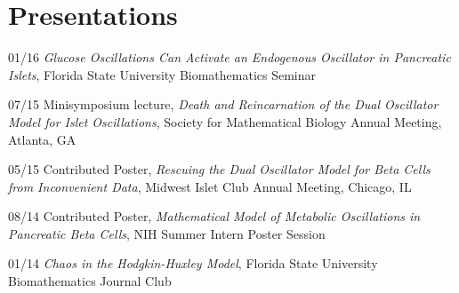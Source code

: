 \documentclass[a4paper]{article}
\begin{document}
\section{Presentations}
\begin{CV}
\item[01/16] {\it Glucose Oscillations Can Activate an Endogenous Oscillator in Pancreatic Islets}, Florida State University Biomathematics Seminar
\item[07/15] Minisymposium lecture, {\it Death and Reincarnation of the Dual Oscillator Model for Islet Oscillations}, Society for Mathematical Biology Annual Meeting, Atlanta, GA
\item[05/15] Contributed Poster, {\it Rescuing the Dual Oscillator Model for Beta Cells from Inconvenient Data}, Midwest Islet Club Annual Meeting, Chicago, IL
\item[08/14] Contributed Poster, {\it Mathematical Model of Metabolic Oscillations in Pancreatic Beta Cells}, NIH Summer Intern Poster Session
\item[01/14] {\it Chaos in the Hodgkin-Huxley Model}, Florida State University Biomathematics Journal Club

\end{CV}
\end{document}
